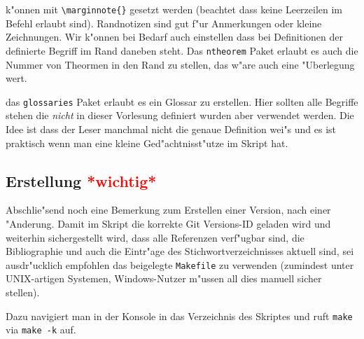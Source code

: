 \documentclass[paper=A4, twoside, chapterprefix=true, bibliography=totoc, headsepline]{scrbook}
\renewcommand{\thesection}{\arabic{section}}
\renewcommand*{\sectionmarkformat}{\thesection\autodot\enskip}
\begin{document}
\begin{description}[font=\normalfont\itshape]
	k"onnen mit \verb|\marginnote{}| gesetzt werden (beachtet dass keine Leerzeilen im Befehl erlaubt sind).
	Randnotizen sind gut f"ur Anmerkungen oder kleine Zeichnungen.
	Wir k"onnen bei Bedarf auch einstellen dass bei Definitionen der definierte Begriff im Rand daneben steht.
	Das \verb|ntheorem| Paket erlaubt es auch die Nummer von Theormen in den Rand zu stellen, das w"are auch eine "Uberlegung wert.
\item[Glossareintr"age:]
	das \verb|glossaries| Paket erlaubt es ein Glossar zu erstellen.
	Hier sollten alle Begriffe stehen die \emph{nicht} in dieser Vorlesung definiert wurden aber verwendet werden.
	Die Idee ist dass der Leser manchmal nicht die genaue Definition wei"s und es ist praktisch wenn man eine kleine Ged"achtnisst"utze im Skript hat.
\end{description}

\subsection*{Erstellung \textcolor{red}{*wichtig*}}
Abschlie"send noch eine Bemerkung zum Erstellen einer  Version, nach einer "Anderung.
Damit im Skript die korrekte Git Versions-ID geladen wird und weiterhin sichergestellt wird, dass alle Referenzen verf"ugbar sind, die Bibliographie und auch die Eintr"age des Stichwortverzeichnisses aktuell sind, sei ausdr"ucklich empfohlen das beigelegte \verb|Makefile| zu verwenden (zumindest unter UNIX-artigen Systemen, Windows-Nutzer m"ussen all dies manuell sicher stellen).

Dazu navigiert man in der Konsole in das Verzeichnis des Skriptes und ruft \verb|make| via \verb|make -k| auf.


  
  
  



\appendix


\renewcommand*{\othersectionlevelsformat}[3]{\ifstr{#1}{section}{\"Ubung\ #3\ vom\ }{#3\autodot\enskip}}

\renewcommand*{\sectionmarkformat}{\"Ubung \thesection\autodot\ vom\enskip}
















\printindex

\printglossaries



\end{document}
